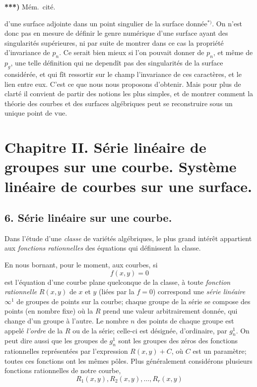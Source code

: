 \documentclass{article}
\begin{document}
\textbf{***)} Mém.\ cité.

d'une surface adjointe dans un point singulier de la surface donnée${}^{*)}$. On n'est donc pas en mesure de définir le genre numérique d'une surface ayant des singularités supérieures, ni par suite de montrer dans ce cas la propriété d'invariance de $p_{n}$. Ce serait bien mieux si l'on pouvait donner de $p_{n}$, et même de $p_{g}$, une telle définition qui ne dependît pas des singularités de la surface considérée, et qui fît ressortir sur le champ l'invariance de ces caractères, et le lien entre eux. C'est ce que nous nous proposons d'obtenir. Mais pour plus de clarté il convient de partir des notions les plus simples, et de montrer comment la théorie des courbes et des surfaces algébriques peut se reconstruire sous un unique point de vue.

\section*{Chapitre II. Série linéaire de groupes sur une courbe. Système linéaire de courbes sur une surface.}

\subsection*{6. Série linéaire sur une courbe.}

Dans l'étude d'une \emph{classe} de variétés algébriques, le plus grand intérêt appartient aux \emph{fonctions rationnelles} des équations qui définissent la classe.

En nous bornant, pour le moment, aux courbes, si
\[ f(x, y) = 0 \]
est l'équation d'une courbe plane quelconque de la classe, à toute \emph{fonction rationnelle} $R(x, y)$ de $x$ et $y$ (liées par la $f = 0$) correspond une \emph{série linéaire} $\infty^{1}$ de groupes de points sur la courbe; chaque groupe de la série se compose des points (en nombre fixe) où la $R$ prend une valeur arbitrairement donnée, qui change d'un groupe à l'autre. Le nombre $n$ des points de chaque groupe est appelé \emph{l'ordre} de la $R$ ou de la série; celle-ci est désignée, d'ordinaire, par $g_{n}^{1}$. On peut dire aussi que les groupes de $g_{n}^{1}$ sont les groupes des zéros des fonctions rationnelles représentées par l'expression $R(x, y) + C$, où $C$ est un paramètre; toutes ces fonctions ont les mêmes pôles. Plus généralement considérons plusieurs fonctions rationnelles de notre courbe,
\[ R_{1}(x, y), R_{2}(x, y), \ldots , R_{r}(x, y) \]
\end{document}
